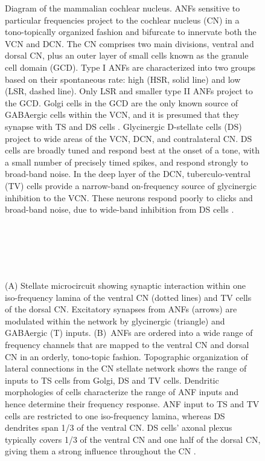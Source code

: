  \begin{figure}[pt!]
\centering
   \caption{Diagram of the mammalian cochlear nucleus. {ANF}s
     sensitive to particular frequencies project to the cochlear
     nucleus (CN) in a tono-topically organized fashion and bifurcate
     to innervate both the {VCN} and {DCN}. The {CN} comprises
     two main divisions, ventral and dorsal CN, plus an outer layer of
     small cells known as the granule cell domain (GCD). Type I
     {ANF}s are characterized into two groups based on their
     spontaneous rate: high (HSR, solid line) and low (LSR, dashed
     line). Only LSR and smaller type II {ANF}s project to the {GCD}.
     Golgi cells in the {GCD} are the only known source of {GABA}ergic
     cells within the VCN, and it is presumed that they synapse with
     TS and DS cells \citep{FerragamoGoldingEtAl:1998}. Glycinergic
     D-stellate cells (DS) project to wide areas of the VCN, DCN,
     and contralateral {CN}. DS cells are broadly tuned and respond
     best at the onset of a tone, with a small number of precisely
     timed spikes, and respond strongly to broad-band noise.  In the
     deep layer of the DCN, tuberculo-ventral (TV) cells provide
     a narrow-band on-frequency source of glycinergic inhibition to
     the VCN. These neurons respond poorly to clicks and
     broad-band noise, due to wide-band inhibition from DS cells
     \citep{SpirouDavisEtAl:1999}.}
\label{fig:GA:CNdiagram}
 \end{figure}


\begin{figure}[t!]
\centering
{}\hspace{3in}\\
\\
\hspace{3in}\\
\\
\caption{(A) Stellate microcircuit showing synaptic interaction within
  one iso-frequency lamina of the ventral {CN} (dotted lines) and TV
  cells of the dorsal CN\@. Excitatory synapses from {ANF}s (arrows)
  are modulated within the network by glycinergic (triangle) and
  GABAergic (T) inputs. (B)~ANFs are ordered into a wide range of
  frequency channels that are mapped to the ventral {CN} and dorsal
  CN in an orderly, tono-topic fashion. Topographic organization of
  lateral connections in the {CN} stellate network shows the range of
  inputs to TS cells from Golgi, DS and TV cells. Dendritic
  morphologies of cells characterize the range of {ANF} inputs and
  hence determine their frequency response. {ANF} input to TS and TV
  cells are restricted to one iso-frequency lamina, whereas DS
  dendrites span 1/3 of the ventral CN\@. DS cells' axonal plexus
  typically covers 1/3 of the ventral {CN} and one half of the dorsal
  CN, giving them a strong influence throughout the {CN}
  \citep{ArnottWallaceEtAl:2004}.}\label{fig:GA:MicroCN}
\end{figure}

